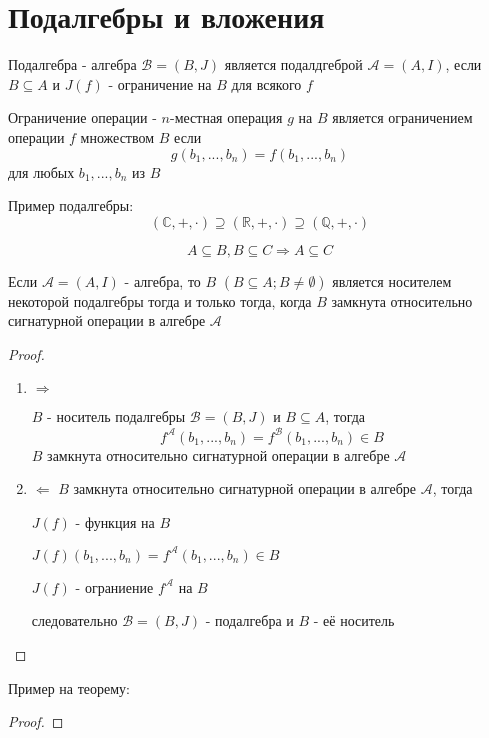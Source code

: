 \documentclass[../main/document.tex]{subfiles}
\begin{document}
\section{Подалгебры и вложения}
\begin{dfn}
Подалгебра - алгебра $\mathcal{B}=(B,J)$ является подалдгеброй $\mathcal{A}=(A,I)$, если $B\subseteq A$ и $J(f)$ - ограничение на $B$ для всякого $f$
\end{dfn}
\begin{dfn}
Ограничение операции - $n$-местная операция $g$ на $B$ является ограничением операции $f$ множеством $B$ если 
$$g(b_1,...,b_n)=f(b_1,...,b_n)$$
для любых $b_1,...,b_n$ из $B$
\end{dfn}
\begin{exm}
Пример подалгебры:
$$(\mathbb{C},+,\cdot)\supseteq (\mathbb{R},+,\cdot)\supseteq (\mathbb{Q},+,\cdot)$$
\end{exm}
\begin{cnsq}
$$A\subseteq B, B\subseteq C \Rightarrow A\subseteq C$$
\end{cnsq}
\begin{thm}
Если $\mathcal{A}=(A,I)$ - алгебра, то $B$ $(B\subseteq A; B\neq \emptyset)$ является носителем некоторой подалгебры тогда и только тогда, когда $B$ замкнута относительно сигнатурной операции в алгебре $\mathcal{A}$
\begin{proof}
\begin{enumerate}
\item $\Rightarrow$

$B$ - носитель подалгебры $\mathcal{B}=(B,J)$ и $B\subseteq A$, тогда
$$f^{\mathcal{A}}(b_1,...,b_n)=f^{\mathcal{B}}(b_1,...,b_n)\in B$$
$B$ замкнута относительно сигнатурной операции в алгебре $\mathcal{A}$
\item $\Leftarrow$
$B$ замкнута относительно сигнатурной операции в алгебре $\mathcal{A}$, тогда

$J(f)$ - функция на $B$

$J(f)(b_1,...,b_n)=f^{\mathcal{A}}(b_1,...,b_n)\in B$

$J(f)$ - ограниение $f^{\mathcal{A}}$  на $B$

следовательно $\mathcal{B}=(B,J)$ - подалгебра и $B$ - её носитель
\end{enumerate}
\end{proof}
\end{thm}
\begin{exm}
Пример на теорему:

\end{exm}

\begin{thm}
\begin{proof}

\end{proof}
\end{thm}
\end{document}
